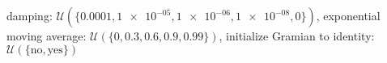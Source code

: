 damping: $\mathcal{U}(\{\num[scientific-notation=true]{0.0001},\num[scientific-notation=true]{1e-05},\num[scientific-notation=true]{1e-06},\num[scientific-notation=true]{1e-08},\num[scientific-notation=false]{0}\})$, exponential moving average: $\mathcal{U}(\{\num[scientific-notation=false]{0},\num[scientific-notation=true]{0.3},\num[scientific-notation=true]{0.6},\num[scientific-notation=true]{0.9},\num[scientific-notation=true]{0.99}\})$, initialize Gramian to identity: $\mathcal{U}(\{\text{no},\text{yes}\})$